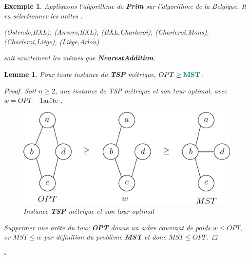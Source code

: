 \documentclass[12pt]{article}
\newcommand{\titre}[1]{\textcolor{title}{#1}}
\newcommand{\cqfd}{\begin{flushright}$\square$\end{flushright}}
\newtheorem{exemple}{Exemple}[section]
\newtheorem{lemme}{Lemme}[section]
\newtheorem{proof}{Preuve}[section]
\begin{document}
\begin{exemple}
Appliquons l'algorithme de \textbf{Prim} sur l'algorithme de la Belgique.
Il va sélectionner les arêtes :\\
\begin{center}
(Ostende,BXL), (Anvers,BXL), (BXL,Charleroi), (Charleroi,Mons), (Charleroi,Liège), (Liège,Arlon)
\end{center}
soit exactement les mêmes que \textbf{NearestAddition}.
\end{exemple}

\begin{lemme}\label{optgeqmst}
Pour toute instance du \textbf{\titre{TSP}} métrique, $OPT \geq \titre{\mathbf{MST}}$.
\begin{proof}
Soit $n\geq 2$, une instance de TSP métrique et son tour optimal, avec $w = OPT - 1 \text{arête}$ :
\begin{figure}[h!]
    \begin{center}
    \includegraphics[scale=0.6]{optTSP.eps}
    \caption{Instance \textbf{\titre{TSP}} métrique et son tour optimal}
    \end{center}
\end{figure}
Supprimer une arête du tour \textbf{OPT} donne un arbre couvrant de poids $w\leq OPT$, or $MST\leq w$ par définition du problème
\textbf{\titre{MST}} et donc $MST\leq OPT$.
\end{proof}
\cqfd
\end{lemme}
\end{document}
